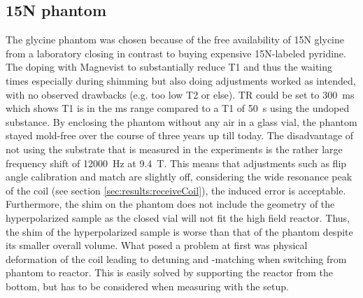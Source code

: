         \subsection{15N phantom}
        The glycine phantom was chosen because of the free availability of 15N glycine from a laboratory closing in contrast to buying expensive 15N-labeled pyridine. The doping with Magnevist to substantially reduce T1 and thus the waiting times especially during shimming but also doing adjustments worked as intended, with no observed drawbacks (e.g. too low T2 or else). TR could be set to \SI{300}{\milli\second} which shows T1 is in the \si{\milli\second} range compared to a T1 of \SI{50}{\second} using the undoped substance.
            By enclosing the phantom without any air in a glass vial, the phantom stayed mold-free over the course of three years up till today.
            The disadvantage of not using the substrate that is measured in the experiments is the rather large frequency shift of \SI{12000}{\hertz} at \SI{9.4}{\tesla}. This means that adjustments such as flip angle calibration and match are slightly off, considering the wide resonance peak of the coil (see section \ref{sec:results:receiveCoil}), the induced error is acceptable.
            Furthermore, the shim on the phantom does not include the geometry of the hyperpolarized sample as the closed vial will not fit the high field reactor. Thus, the shim of the hyperpolarized sample is worse than that of the phantom despite its smaller overall volume.
            What posed a problem at first was physical deformation of the coil leading to detuning and -matching when switching from phantom to reactor. This is easily solved by supporting the reactor from the bottom, but has to be considered when measuring with the setup.

